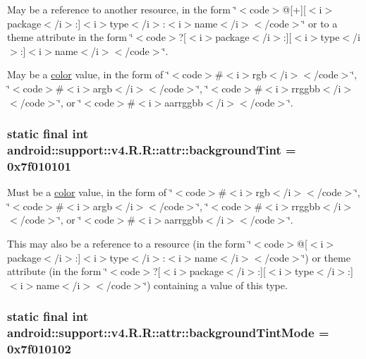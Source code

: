 May be a reference to another resource, in the form \char`\"{}$<$code$>$@\mbox{[}+\mbox{]}\mbox{[}$<$i$>$package$<$/i$>$:\mbox{]}$<$i$>$type$<$/i$>$:$<$i$>$name$<$/i$>$$<$/code$>$\char`\"{} or to a theme attribute in the form \char`\"{}$<$code$>$?\mbox{[}$<$i$>$package$<$/i$>$:\mbox{]}\mbox{[}$<$i$>$type$<$/i$>$:\mbox{]}$<$i$>$name$<$/i$>$$<$/code$>$\char`\"{}. 

May be a \hyperlink{classandroid_1_1support_1_1v4_1_1_r_1_1color}{color} value, in the form of \char`\"{}$<$code$>$\#$<$i$>$rgb$<$/i$>$$<$/code$>$\char`\"{}, \char`\"{}$<$code$>$\#$<$i$>$argb$<$/i$>$$<$/code$>$\char`\"{}, \char`\"{}$<$code$>$\#$<$i$>$rrggbb$<$/i$>$$<$/code$>$\char`\"{}, or \char`\"{}$<$code$>$\#$<$i$>$aarrggbb$<$/i$>$$<$/code$>$\char`\"{}. \hypertarget{classandroid_1_1support_1_1v4_1_1_r_1_1attr_10302b9e509eeb7d065933f291728fa4}{
\subsubsection[{backgroundTint}]{\setlength{\rightskip}{0pt plus 5cm}static final int android::support::v4.R.R::attr::backgroundTint = 0x7f010101}}
\label{classandroid_1_1support_1_1v4_1_1_r_1_1attr_10302b9e509eeb7d065933f291728fa4}


Must be a \hyperlink{classandroid_1_1support_1_1v4_1_1_r_1_1color}{color} value, in the form of \char`\"{}$<$code$>$\#$<$i$>$rgb$<$/i$>$$<$/code$>$\char`\"{}, \char`\"{}$<$code$>$\#$<$i$>$argb$<$/i$>$$<$/code$>$\char`\"{}, \char`\"{}$<$code$>$\#$<$i$>$rrggbb$<$/i$>$$<$/code$>$\char`\"{}, or \char`\"{}$<$code$>$\#$<$i$>$aarrggbb$<$/i$>$$<$/code$>$\char`\"{}. 

This may also be a reference to a resource (in the form \char`\"{}$<$code$>$@\mbox{[}$<$i$>$package$<$/i$>$:\mbox{]}$<$i$>$type$<$/i$>$:$<$i$>$name$<$/i$>$$<$/code$>$\char`\"{}) or theme attribute (in the form \char`\"{}$<$code$>$?\mbox{[}$<$i$>$package$<$/i$>$:\mbox{]}\mbox{[}$<$i$>$type$<$/i$>$:\mbox{]}$<$i$>$name$<$/i$>$$<$/code$>$\char`\"{}) containing a value of this type. \hypertarget{classandroid_1_1support_1_1v4_1_1_r_1_1attr_eff75e05950e4768c976095bd54d08bf}{
\subsubsection[{backgroundTintMode}]{\setlength{\rightskip}{0pt plus 5cm}static final int android::support::v4.R.R::attr::backgroundTintMode = 0x7f010102}}
\label{classandroid_1_1support_1_1v4_1_1_r_1_1attr_eff75e05950e4768c976095bd54d08bf}


